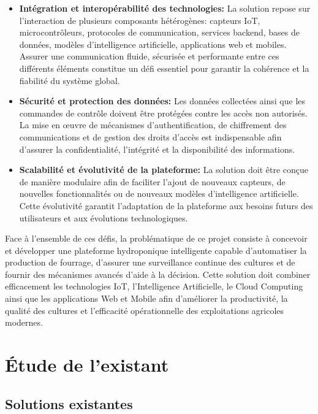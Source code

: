 \begin{itemize}
	\item \textbf{Intégration et interopérabilité des technologies: } 
	La solution repose sur l’interaction de plusieurs composants hétérogènes: capteurs IoT, microcontrôleurs, protocoles de communication, services backend, bases de données, modèles d’intelligence artificielle, applications web et mobiles. Assurer une communication fluide, sécurisée et performante entre ces différents éléments constitue un défi essentiel pour garantir la cohérence et la fiabilité du système global.
	\item \textbf{Sécurité et protection des données: } 
	Les données collectées ainsi que les commandes de contrôle doivent être protégées contre les accès non autorisés. La mise en œuvre de mécanismes d’authentification, de chiffrement des communications et de gestion des droits d’accès est indispensable afin d’assurer la confidentialité, l’intégrité et la disponibilité des informations.
	\item \textbf{Scalabilité et évolutivité de la plateforme: } 
	La solution doit être conçue de manière modulaire afin de faciliter l’ajout de nouveaux capteurs, de nouvelles fonctionnalités ou de nouveaux modèles d’intelligence artificielle. Cette évolutivité garantit l’adaptation de la plateforme aux besoins futurs des utilisateurs et aux évolutions technologiques.
	
\end{itemize}
Face à l’ensemble de ces défis, la problématique de ce projet consiste à concevoir et développer une plateforme hydroponique intelligente capable d’automatiser la production de fourrage, d’assurer une surveillance continue des cultures et de fournir des mécanismes avancés d’aide à la décision. Cette solution doit combiner efficacement les technologies IoT, l’Intelligence Artificielle, le Cloud Computing ainsi que les applications Web et Mobile afin d’améliorer la productivité, la qualité des cultures et l’efficacité opérationnelle des exploitations agricoles modernes.
\section{Étude de l’existant}

\subsection{Solutions existantes}

